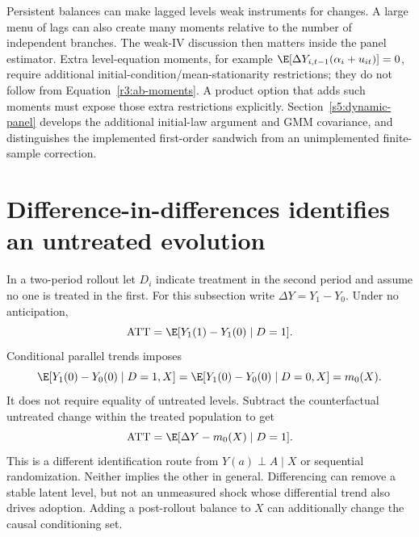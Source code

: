 Persistent balances can make lagged levels weak instruments for
changes. A large menu of lags can also create many moments relative to
the number of independent branches. The weak-IV discussion then
matters inside the panel estimator. Extra level-equation moments, for
example $\E[\Delta Y_{i,t-1}(\alpha_i+u_{it})]=0$, require additional
initial-condition/mean-stationarity restrictions; they do not follow
from Equation~\eqref{r3:ab-moments}. A product option that adds such
moments must expose those extra restrictions explicitly. Section~\ref{s5:dynamic-panel} develops the additional initial-law
argument and GMM covariance, and distinguishes the implemented first-order
sandwich from an unimplemented finite-sample correction.

\section{Difference-in-differences identifies an untreated evolution}
\label{r3:did-identification}
In a two-period rollout let $D_i$ indicate treatment in the second
period and assume no one is treated in the first. For this subsection
write $\Delta Y=Y_1-Y_0$. Under no anticipation,
\[
 \operatorname{ATT}=\E[Y_1(1)-Y_1(0)\mid D=1].
\]
Conditional parallel trends imposes
\begin{equation}
 \E[Y_1(0)-Y_0(0)\mid D=1,X]
 =\E[Y_1(0)-Y_0(0)\mid D=0,X]=m_0(X).
 \label{r3:parallel-trends}
\end{equation}
It does not require equality of untreated levels. Subtract the
counterfactual untreated change within the treated population to get
\begin{equation}
 \operatorname{ATT}=\E[\Delta Y-m_0(X)\mid D=1].
 \label{r3:did-functional}
\end{equation}
This is a different identification route from
$Y(a)\perp A\mid X$ or sequential randomization. Neither implies
the other in general. Differencing can remove a stable latent level,
but not an unmeasured shock whose differential trend also drives
adoption. Adding a post-rollout balance to $X$ can additionally change
the causal conditioning set.

